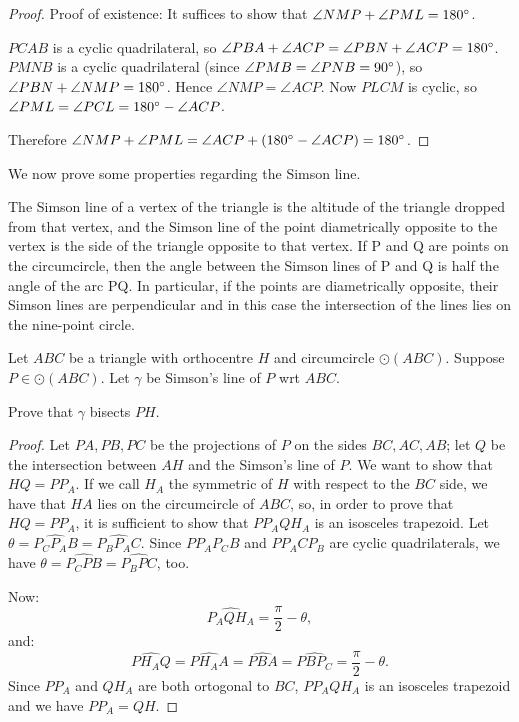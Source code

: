 \begin{proof}
Proof of existence: It suffices to show that $\angle NMP+\angle PML=180\degree$. 

$PCAB$ is a cyclic quadrilateral, so $\angle PBA+\angle ACP=\angle PBN+\angle ACP=180\degree$. $PMNB$ is a cyclic quadrilateral (since $\angle PMB=\angle PNB=90\degree$), so $\angle PBN+\angle NMP=180\degree$. Hence $\angle NMP=\angle ACP$. Now $PLCM$ is cyclic, so $\angle PML=\angle PCL=180\degree-\angle ACP$.

Therefore $\angle NMP+\angle PML=\angle ACP+(180\degree-\angle ACP)=180\degree$.
\end{proof}

We now prove some properties regarding the Simson line.

The Simson line of a vertex of the triangle is the altitude of the triangle dropped from that vertex, and the Simson line of the point diametrically opposite to the vertex is the side of the triangle opposite to that vertex.
If P and Q are points on the circumcircle, then the angle between the Simson lines of P and Q is half the angle of the arc PQ. In particular, if the points are diametrically opposite, their Simson lines are perpendicular and in this case the intersection of the lines lies on the nine-point circle.

\begin{lemma}
Let $ABC$ be a triangle with orthocentre $H$ and circumcircle $\odot(ABC)$. Suppose $P\in\odot(ABC)$. Let $\gamma$ be Simson's line of $P$ wrt $ABC$.

Prove that $\gamma$ bisects $PH$.
\end{lemma}

\begin{proof}
Let $PA,PB,PC$ be the projections of $P$ on the sides $BC,AC,AB$; let $Q$ be the intersection between $AH$ and the Simson's line of $P$. We want to show that $HQ=PP_A$. If we call $H_A$ the symmetric of $H$ with respect to the $BC$ side, we have that $HA$ lies on the circumcircle of $ABC$, so, in order to prove that $HQ=PP_A$, it is sufficient to show that $PP_AQH_A$ is an isosceles trapezoid. Let $\theta=\widehat{P_C P_A B}=\widehat{P_B P_A C}$. Since $PP_AP_CB$ and $PP_ACP_B$ are cyclic quadrilaterals, we have $\theta=\widehat{P_C P B}=\widehat{P_B P C}$, too.

Now:
\[\widehat{P_A Q H_A}=\frac{\pi}{2}-\theta,\]
and:
\[\widehat{P H_A Q}=\widehat{P H_A A}=\widehat{P B A}=\widehat{P B P_C}=\frac{\pi}{2}-\theta.\]
Since $PP_A$ and $QH_A$ are both ortogonal to $BC$, $PP_AQH_A$ is an isosceles trapezoid and we have $PP_A=QH$.
\end{proof}

